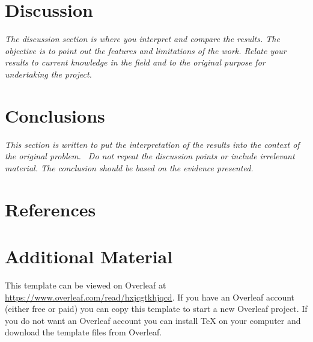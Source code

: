 \documentclass[11pt,a4paper,oneside]{report}
\newcommand{\instructions}[1]{{\color{black}\itshape #1}}
\begin{document}

\chapter{Discussion}
\label{discussion}

\instructions{The discussion section is where you interpret and compare the
results. The objective is to point out the features and limitations of
the work. Relate your results to current knowledge in the field and to
the original purpose for undertaking the project.}


\chapter{Conclusions}
\label{conclusions}

\instructions{This section is written to put the interpretation of the results
into the context of the original problem.~ Do not repeat the discussion
points or include irrelevant material. The conclusion should be based on
the evidence presented.}


\chapter*{References}
\label{references}



\printbibliography[heading=none]



\appendix

\chapter{Additional Material}
\label{appendix-a}

This template can be viewed on Overleaf at \url{https://www.overleaf.com/read/hxjcgtkhjqcd}.
If you have an Overleaf account (either free or paid) you can copy this template to start a new Overleaf project.
If you do not want an Overleaf account you can install TeX on your computer and download the template files from Overleaf.
\end{document}
